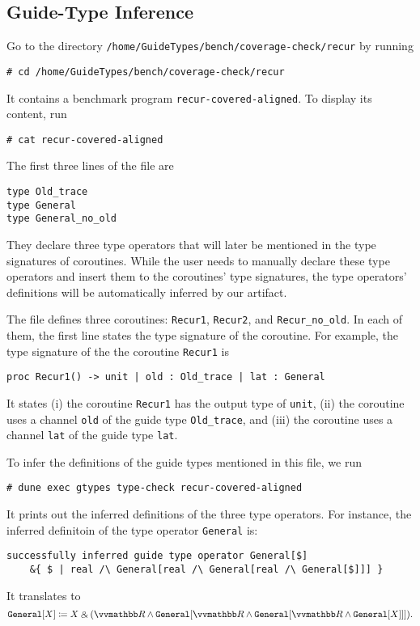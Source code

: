 \subsection{Guide-Type Inference}
\label{sec:Guide-Type Inference}

Go to the directory
\texttt{/home/GuideTypes/bench/coverage-check/recur} by running
\begin{verbatim}
# cd /home/GuideTypes/bench/coverage-check/recur
\end{verbatim}
%
It contains a benchmark program \texttt{recur-covered-aligned}.
%
To display its content, run
\begin{verbatim}
# cat recur-covered-aligned
\end{verbatim}

The first three lines of the file are
\begin{verbatim}
type Old_trace
type General
type General_no_old
\end{verbatim}
%
They declare three type operators that will later be mentioned in the type
signatures of coroutines.
%
While the user needs to manually declare these type operators and insert them to
the coroutines' type signatures, the type operators' definitions will be
automatically inferred by our artifact.

The file defines three coroutines: \texttt{Recur1}, \texttt{Recur2},
and \texttt{Recur\_no\_old}.
%
In each of them, the first line states the type signature of the coroutine.
%
For example, the type signature of the the coroutine \texttt{Recur1} is
\begin{verbatim}
proc Recur1() -> unit | old : Old_trace | lat : General
\end{verbatim}
%
It states (i) the coroutine \texttt{Recur1} has the output type of
\texttt{unit}, (ii) the coroutine uses a channel \texttt{old} of the guide
type \texttt{Old\_trace}, and (iii) the coroutine uses a channel
\texttt{lat} of the guide type \texttt{lat}.

To infer the definitions of the guide types mentioned in this file, we run
\begin{verbatim}
# dune exec gtypes type-check recur-covered-aligned
\end{verbatim}
%
It prints out the inferred definitions of the three type operators.
%
For instance, the inferred definitoin of the type operator \texttt{General} is:
\begin{verbatim}
successfully inferred guide type operator General[$]
	&{ $ | real /\ General[real /\ General[real /\ General[$]]] }
\end{verbatim}
%
It translates to
\begin{equation*}
  \texttt{General} [X] \coloneq X \echoice (\treal \land \texttt{General} [\treal \land \texttt{General} [\treal \land \texttt{General} [X]]]).
\end{equation*}

